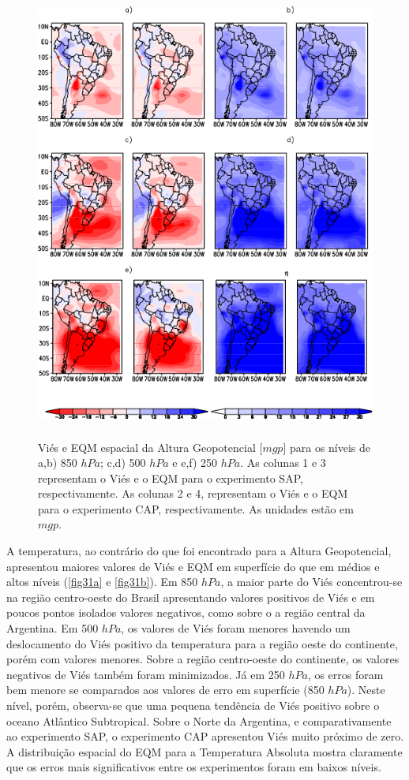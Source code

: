 \begin{figure}[!hbp]
\centering
\includegraphics[height=15cm]{./figs/campo_vies_eqm-zgeo.png}
\caption{Viés e EQM espacial da Altura Geopotencial [$mgp$] para os níveis de a,b) 850 $hPa$; c,d) 500 $hPa$ e e,f) 250 $hPa$. As colunas 1 e 3 representam o Viés e o EQM para o experimento SAP, respectivamente. As colunas 2 e 4, representam o Viés e o EQM para o experimento CAP, respectivamente. As unidades estão em $mgp$.}
\label{fig30b}
\end{figure}

A temperatura, ao contrário do que foi encontrado para a Altura Geopotencial, apresentou maiores valores de Viés e EQM em superfície do que em médios e altos níveis (\autoref{fig31a} e \autoref{fig31b}). Em 850 $hPa$, a maior parte do Viés concentrou-se na região centro-oeste do Brasil apresentando valores positivos de Viés e em poucos pontos isolados valores negativos, como sobre o a região central da Argentina. Em 500 $hPa$, os valores de Viés foram menores havendo um deslocamento do Viés positivo da temperatura para a região oeste do continente, porém com valores menores. Sobre a região centro-oeste do continente, os valores negativos de Viés também foram minimizados. Já em 250 $hPa$, os erros foram bem menore se comparados aos valores de erro em superfície (850 $hPa$). Neste nível, porém, observa-se que uma pequena tendência de Viés positivo sobre o oceano Atlântico Subtropical. Sobre o Norte da Argentina, e comparativamente ao experimento SAP, o experimento CAP apresentou Viés muito próximo de zero. A distribuição espacial do EQM para a Temperatura Absoluta mostra claramente que os erros mais significativos entre os experimentos foram em baixos níveis.


